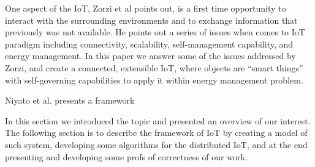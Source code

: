 \documentclass[../main/IoT.tex]{subfiles}
\begin{document}
One aspect of the IoT, Zorzi et al \cite{zorzi2010today} points out, is a first time opportunity to interact with the surrounding environments and to exchange information that previously was not available. He points out a series of issues when comes to IoT paradigm including connectivity, scalability, self-management capability, and energy management. In this paper we answer some of the issues addressed by Zorzi, and create a connected, extensible IoT, where objects are ``smart things'' with self-governing capabilities to apply it within energy management problem.

Niyato et al. \cite{niyato2011machine} presents a framework

In this section we introduced the topic and presented an overview of our interest. The following section is to describe the framework of IoT by creating a model of such system, developing some algorithms for the distributed IoT, and at the end presenting and developing some profs of correctness of our work.
\end{document}
